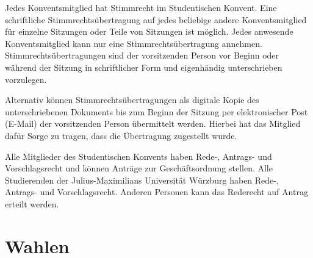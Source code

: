 \documentclass[10pt,a4paper]{scrartcl}
\begin{document}
\begin{contract}

\label{stimmrecht-und-stimmrechtsuebertragungen}

Jedes Konventsmitglied hat Stimmrecht im Studentischen Konvent. Eine
schriftliche Stimmrechtsübertragung auf jedes beliebige andere
Konventsmitglied für einzelne Sitzungen oder Teile von Sitzungen ist
möglich. Jedes anwesende Konventsmitglied kann nur eine
Stimmrechtsübertragung annehmen. Stimmrechtsübertragungen sind der
vorsitzenden Person vor Beginn oder während der Sitzung in schriftlicher
Form und eigenhändig unterschrieben vorzulegen.

Alternativ können Stimmrechtsübertragungen als digitale Kopie des
unterschriebenen Dokuments bis zum Beginn der Sitzung per elektronischer Post
(E-Mail) der vorsitzenden Person übermittelt werden. Hierbei hat das Mitglied
dafür Sorge zu tragen, dass die Übertragung zugestellt wurde.


\label{rede--antrags--und-vorschlagsrecht}

Alle Mitglieder des Studentischen Konvents haben Rede-, Antrags- und
Vorschlagsrecht und können Anträge zur Geschäftsordnung stellen. Alle
Studierenden der Julius-Maximilians Universität Würzburg haben Rede-,
Antrags- und Vorschlagsrecht. Anderen Personen kann das Rederecht auf
Antrag erteilt werden.

\end{contract}

\section{Wahlen}\label{wahlen}
\end{document}
